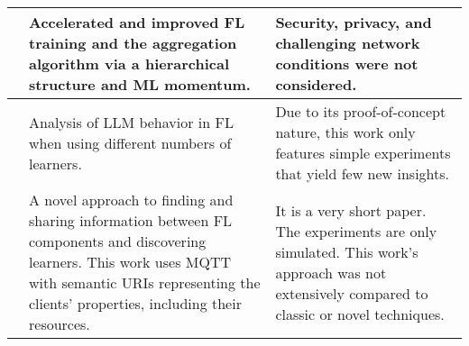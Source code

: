 \begin{changemargin}{-2cm}{0cm}
\begin{tabular}{|c||m{0.4\paperwidth}|m{0.4\paperwidth}|}
            &
            Accelerated and improved FL training and the aggregation algorithm via a hierarchical structure and ML momentum.
            &
            Security, privacy, and challenging network conditions were not considered.
        \\
        \hline
            \cite{paper:scaling_fl_for_fine_tuning_llms}
            &
            Analysis of LLM behavior in FL when using different numbers of learners.
            &
            Due to its proof-of-concept nature, this work only features simple experiments that yield few new insights.
        \\
        \hline
            \cite{paper:edge_fl_via_mqtt_and_oma_lightweight_m2m}
            &
            A novel approach to finding and sharing information between FL components and discovering learners.
            This work uses MQTT with semantic URIs representing the clients' properties, including their resources.
            &
            It is a very short paper.
            The experiments are only simulated.
            This work's approach was not extensively compared to classic or novel techniques.
        \\
        \hline
    \end{tabular}
    \label{table:fl_research_table_2}
\end{changemargin}
